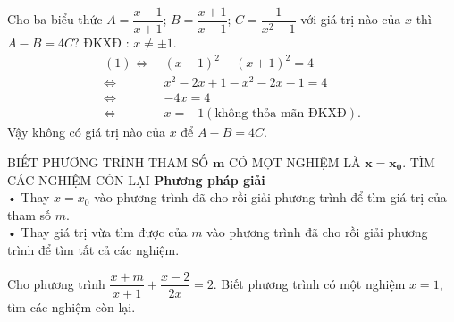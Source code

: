 \begin{vd}%
Cho ba biểu thức $A=\dfrac{x-1}{x+1}$; $B=\dfrac{x+1}{x-1}$; $C=\dfrac{1}{x^2-1}$ với giá trị nào của $x$ thì $A-B=4C$?
\loigiai{
\[A-B=4C \Leftrightarrow \dfrac{x-1}{x+1}-\dfrac{x+1}{x-1}=\dfrac{4}{x^2-1}\quad (1).\]
}
ĐKXĐ : $x \ne \pm 1$. 
\begin{align*}
(1) \Leftrightarrow ~& (x-1)^2-(x+1)^2=4 \\
\Leftrightarrow ~& x^2-2x+1-x^2-2x-1=4 \\
\Leftrightarrow ~&-4x=4 \\
\Leftrightarrow ~&x=-1 (\textrm{không thỏa mãn ĐKXĐ}).
\end{align*}
Vậy không có giá trị nào của $x$ để $A-B=4C$. 
\end{vd}

\begin{dang}{BIẾT PHƯƠNG TRÌNH THAM SỐ $\mathbf{m}$ CÓ MỘT NGHIỆM LÀ $\mathbf{x=x_0}$. TÌM CÁC NGHIỆM CÒN LẠI}
\textbf{Phương pháp giải} \\
• Thay $x=x_0$ vào phương trình đã cho rồi giải phương trình để tìm giá trị của tham số $m$.  \\
• Thay giá trị vừa tìm được của $m$ vào phương trình đã cho rồi giải phương trình để tìm tất cả các nghiệm.
\end{dang}

\begin{vd}%
Cho phương trình $\dfrac{x+m}{x+1}+\dfrac{x-2}{2x}=2$. Biết phương trình có một nghiệm $x=1$, tìm các nghiệm còn lại. 
\end{vd}

